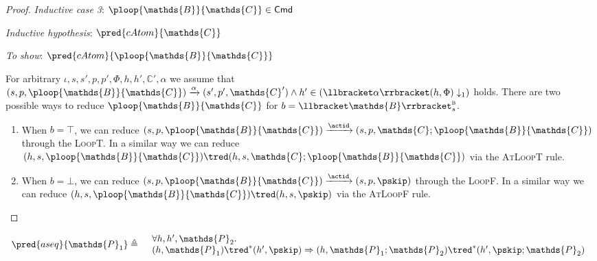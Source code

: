 {\begin{proof}
\textit{Inductive case 3}: $\ploop{\mathds{B}}{\mathds{C}} \in \mathsf{Cmd}$

\textit{Inductive hypothesis}: $\pred{cAtom}{\mathds{C}}$

\textit{To show}: $\pred{cAtom}{\ploop{\mathds{B}}{\mathds{C}}}$

For arbitrary $\iota, s, s', p, p', \Phi, h, h', \mathds{C}', \alpha$ we assume that $(s, p, \ploop{\mathds{B}}{\mathds{C}}) \xrightarrow{\alpha} (s', p', \mathds{C}') \land h' \in \left( \llbracket \alpha \rrbracket(h, \Phi) \downarrow_1 \right)$ holds. There are two possible ways to reduce $\ploop{\mathds{B}}{\mathds{C}}$ for $b = \llbracket \mathds{B} \rrbracket_{s}^{\textsc{b}}$.
\begin{enumerate}
\item When $b = \top$, we can reduce $(s, p, \ploop{\mathds{B}}{\mathds{C}}) \xrightarrow{\actid} (s, p, \mathds{C} ; \ploop{\mathds{B}}{\mathds{C}})$ through the \textsc{LoopT}. In a similar way we can reduce $(h, s, \ploop{\mathds{B}}{\mathds{C}}) \tred (h, s, \mathds{C} ; \ploop{\mathds{B}}{\mathds{C}})$ via the \textsc{AtLoopT} rule.
\item When $b = \bot$, we can reduce $(s, p, \ploop{\mathds{B}}{\mathds{C}}) \xrightarrow{\actid} (s, p, \pskip)$ through the \textsc{LoopF}. In a similar way we can reduce $(h, s, \ploop{\mathds{B}}{\mathds{C}}) \tred (h, s, \pskip)$ via the \textsc{AtLoopF} rule.
\end{enumerate}
\end{proof}
}

\lem \label{ref:aseq}
\[
\begin{array}{r l}
	\pred{aseq}{\mathds{P}_1} \triangleq
	&
	\begin{array}{l}
	\forall h, h', \mathds{P}_2 \ldotp \\
	(h, \mathds{P}_1) \tred^* (h', \pskip) \Rightarrow 
	(h, \mathds{P}_1; \mathds{P}_2) \tred^* (h', \pskip; \mathds{P}_2)
	\end{array}
\end{array}
\]

